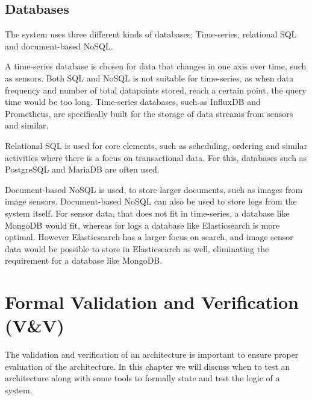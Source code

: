 
\subsection{Databases}

The system uses three different kinds of databases; Time-series, relational SQL and document-based NoSQL.

A time-series database is chosen for data that changes in one axis over time, such as sensors. Both SQL and NoSQL is not suitable for time-series, as when data frequency and number of total datapoints stored, reach a certain point, the query time would be too long. Time-series databases, such as InfluxDB and Prometheus, are specifically built for the storage of data streams from sensors and similar.

Relational SQL is used for core elements, such as scheduling, ordering and similar activities where there is a focus on transactional data. For this, databases such as PostgreSQL and MariaDB are often used.

Document-based NoSQL is used, to store larger documents, such as images from image sensors. Document-based NoSQL can also be used to store logs from the system itself. For sensor data, that does not fit in time-series, a database like MongoDB would fit, whereas for logs a database like Elasticsearch is more optimal. However Elasticsearch has a larger focus on search, and image sensor data would be possible to store in Elasticsearch as well, eliminating the requirement for a database like MongoDB. 


\section{Formal Validation and Verification (V\&V)}
\label{sec:formal-v-v}
The validation and verification of an architecture is important to ensure proper evaluation of the architecture. In this chapter we will discuss when to test an architecture along with some tools to formally state and test the logic of a system.

